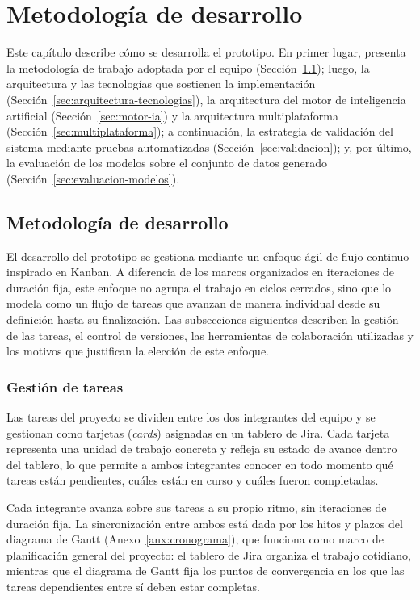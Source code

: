 \chapter{Metodología de desarrollo}
\label{cha:metodologia}

Este capítulo describe cómo se desarrolla el prototipo. En primer lugar, presenta la metodología de trabajo adoptada por el equipo (Sección~\ref{sec:metodologia}); luego, la arquitectura y las tecnologías que sostienen la implementación (Sección~\ref{sec:arquitectura-tecnologias}), la arquitectura del motor de inteligencia artificial (Sección~\ref{sec:motor-ia}) y la arquitectura multiplataforma (Sección~\ref{sec:multiplataforma}); a continuación, la estrategia de validación del sistema mediante pruebas automatizadas (Sección~\ref{sec:validacion}); y, por último, la evaluación de los modelos sobre el conjunto de datos generado (Sección~\ref{sec:evaluacion-modelos}).

\section{Metodología de desarrollo}
\label{sec:metodologia}

El desarrollo del prototipo se gestiona mediante un enfoque ágil de flujo continuo inspirado en Kanban. A diferencia de los marcos organizados en iteraciones de duración fija, este enfoque no agrupa el trabajo en ciclos cerrados, sino que lo modela como un flujo de tareas que avanzan de manera individual desde su definición hasta su finalización. Las subsecciones siguientes describen la gestión de las tareas, el control de versiones, las herramientas de colaboración utilizadas y los motivos que justifican la elección de este enfoque.

\subsection{Gestión de tareas}
\label{sec:gestion-tareas}

Las tareas del proyecto se dividen entre los dos integrantes del equipo y se gestionan como tarjetas (\emph{cards}) asignadas en un tablero de Jira. Cada tarjeta representa una unidad de trabajo concreta y refleja su estado de avance dentro del tablero, lo que permite a ambos integrantes conocer en todo momento qué tareas están pendientes, cuáles están en curso y cuáles fueron completadas.

Cada integrante avanza sobre sus tareas a su propio ritmo, sin iteraciones de duración fija. La sincronización entre ambos está dada por los hitos y plazos del diagrama de Gantt (Anexo~\ref{anx:cronograma}), que funciona como marco de planificación general del proyecto: el tablero de Jira organiza el trabajo cotidiano, mientras que el diagrama de Gantt fija los puntos de convergencia en los que las tareas dependientes entre sí deben estar completas.

